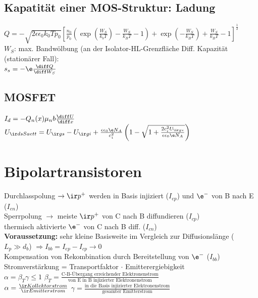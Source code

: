 \documentclass[fs, footer]{latex4ei}
\begin{document}
\begin{multicols*}{4}
\subsection{Kapatität einer MOS-Struktur: Ladung}
$Q=-\sqrt{2\epsilon\epsilon_0k_0Tp_0}\left[\frac{n_0}{p_0}\left(\exp\left(\frac{W_S}{k_bT}\right)-\frac{W_S}{k_BT}-1\right)+\exp\left(-\frac{W_S}{k_BT}\right)+\frac{W_S}{k_BT}-1\right]^\frac{1}{2}$\\
$W_S$: max. Bandwölbung (an der Isolator-HL-Grenzfläche
Diff. Kapazität (stationärer Fall):\\
$s_s = -\e\frac{\diff Q}{\diff W_S}$\\
\subsection{MOSFET}
$I_d=-Q_n(x)\mu_nb\frac{\diff U}{\diff x}$\\
$U_{\ir dsSaett} = U_{\ir gs}-U_{\ir gi}+\frac{\epsilon\epsilon_0\e N_A}{c_i^2}\left(1-\sqrt{1+\frac{2c_i^2U_{\ir gs}}{\epsilon\epsilon_0\e N_A}}\right)$\\
\section{Bipolartransistoren}
Durchlasspolung $\rightarrow \ir p^+$ werden in Basis injiziert ($I_{ep}$) und $\e^-$ von B nach E ($I_{en}$)\\
Sperrpolung $\rightarrow$ meiste $\ir p^+$ von C nach B diffundieren ($I_{cp}$)\\
thermisch aktivierte $\e^-$ von C nach B diff. ($I_{cn}$)\\
\textbf{Voraussetzung:} sehr kleine Basisweite im Vergleich zur Diffusionslänge ($L_p \gg d_b$) $\Rightarrow I_{bb} = I_{ep} - I_{cp} \rightarrow 0$ \\
Kompensation von Rekombination durch Bereitstellung von $\e^-$ ($I_{bb}$)\\
Stromverstärkung = Transportfaktor $\cdot$ Emitterergiebigkeit\\
$\alpha = \beta_T\gamma \leq 1$\qquad
$\beta_T = \frac{\text{C-B-Übergang erreichender Elektronenstrom}}{\text{von E in B injizierter Elektronenstrom}}$\\
$\alpha = \frac{\ir Kollektorstrom}{\ir Emitterstrom}$\qquad
$\gamma = \frac{\text{in die Basis injizierter Elektronenstrom}}{\text{gesamter Emitterstrom}}$\\


\end{multicols*}
\end{document}
